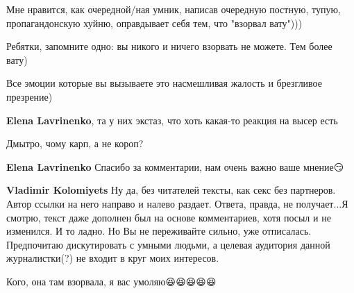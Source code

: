 \begin{itemize}
\begin{itemize}
Мне нравится, как очередной/ная умник, написав очередную постную, тупую,
пропагандонскую хуйню, оправдывает себя тем, что "взорвал вату")))

Ребятки, запомните одно: вы никого и ничего взорвать не можете. Тем более вату)

Все эмоции которые вы вызываете это насмешливая жалость и брезгливое презрение)


 
\textbf{Elena Lavrinenko}, та у них экстаз, что хоть какая-то реакция на высер есть

 
Дмытро, чому карп, а не короп?

 
\textbf{Elena Lavrinenko} Спасибо за комментарии, нам очень важно ваше мнение😏

 
\textbf{Vladimir Kolomiyets} Ну да, без читателей тексты, как секс без партнеров. Автор ссылки на него направо и налево раздает. Ответа, правда, не получает...Я смотрю, текст даже дополнен был на основе комментариев, хотя посыл и не изменился. И то ладно. Но Вы не переживайте сильно, уже отписалась. Предпочитаю дискутировать с умными людьми, а целевая аудитория данной журналистки(?) не входит в круг моих интересов.

 
Кого, она там взорвала, я вас умоляю😆😆😆😆😆


\end{itemize}
\end{itemize}
